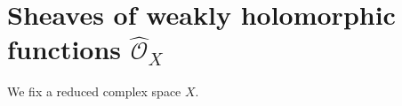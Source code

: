 \documentclass[12pt,b5paper,notitlepage]{report}
\theoremstyle{definition}
\newtheorem{rem}[df]{Remark}
\theoremstyle{plain}
\newtheorem{pp}[df]{Proposition}
\newcommand{\scr}{\mathscr}
\newcommand{\Supp}{\mathrm{Supp}}
\newcommand{\Owht}{\widehat{\scr O}}
\numberwithin{equation}{section}
\begin{document}
\begin{comment}
\begin{rem}
In the general case that $X$ is not necessarily reduced, if $\scr E,\scr F$ are coherent $\scr O_X$-submodules of a coherent $\scr O_X$-module $\scr G$, then as sets,
\begin{align}
\Supp(\scr E/\scr E\cap\scr F)=\{x\in X:\scr E_x\nsubset\scr F_x\},\label{eq80}
\end{align}
which are analytic subsets of $X$ because $\scr E/\scr E\cap\scr F$ is coherent due to Cor. \ref{lb110}. With the help of this observation, we now show:
\end{rem}


\begin{pp}
Let $f\in\scr M_X(X)$. Then $P(f)$ is a nowhere dense analytic subset of $X$.
\end{pp}



\begin{proof}
By \eqref{eq80}, we have (at the level of sets) that
\begin{align}
P(f)=\Supp(\scr O_Xf/\scr O_Xf\cap\scr O_X)   \label{eq94}
\end{align}
which is analytic because, by Prop. \ref{lb187}, $f\scr O_X$ and $f\scr O_X+\scr O_X$ are coherent $\scr O_X$-submodules of $\scr M_X$. Each $x\in X$ is contained in a neighborhood $U\subset X$ such that one can find $v\in\scr O(X)$ satisfying that $vf\in\scr O(U)$ and that $v$ is a non zero-divisor of $\scr O_{X,x}$. By Prop. \ref{lb121}, we may shrink $U$ to a smaller neighborhood of $x$ so that $N(v)$ is nowhere dense in $U$. Since the stalks of $v$ are invertible outside $N(v)$, we have  $U\cap P(f)\subset U\cap N(v)$, which shows that $U\cap P(f)$ is nowhere dense in $U$. Therefore $P(v)$ is nowhere dense in $X$.
\end{proof}
\end{comment}








\section{Sheaves of weakly holomorphic functions $\Owht_X$}


We fix a reduced complex space $X$.
\end{document}
